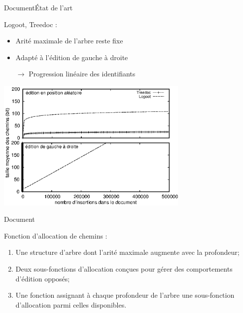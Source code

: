 \begin{frame}{Document}{État de l'art}
  
  Logoot,
  Treedoc : 
  \begin{itemize}
  \item Arité maximale de l'arbre reste fixe
  \item Adapté à l'édition de gauche à droite
  \item [$\rightarrow$] Progression linéaire des identifiants
  \end{itemize}

  \begin{center}
    \includegraphics[width=0.7\textwidth]{img/replication/motivationartificial.eps}
  \end{center}
  \vspace{0.025cm}

\end{frame}


\begin{frame}{Document}{\LSEQ}
  
  Fonction d'allocation de chemins :
  \begin{enumerate}
  \item Une structure d'arbre dont l'arité maximale augmente avec la profondeur;
  \item Deux sous-fonctions d'allocation conçues pour gérer des comportements
    d'édition opposés;
  \item Une fonction assignant à chaque profondeur de l'arbre une sous-fonction
    d'allocation parmi celles disponibles.
  \end{enumerate}
  
\end{frame}


